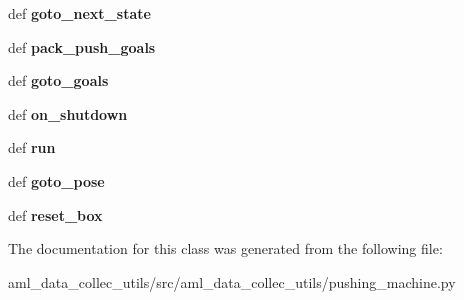 \begin{DoxyCompactItemize}
\item 
\hypertarget{classaml__data__collec__utils_1_1pushing__machine_1_1_push_machine_a55192fc3a9d96d893f7743472d51e7d8}{def {\bfseries goto\-\_\-next\-\_\-state}}\label{classaml__data__collec__utils_1_1pushing__machine_1_1_push_machine_a55192fc3a9d96d893f7743472d51e7d8}

\item 
\hypertarget{classaml__data__collec__utils_1_1pushing__machine_1_1_push_machine_af849340ad5c34bb485e6ced00504d757}{def {\bfseries pack\-\_\-push\-\_\-goals}}\label{classaml__data__collec__utils_1_1pushing__machine_1_1_push_machine_af849340ad5c34bb485e6ced00504d757}

\item 
\hypertarget{classaml__data__collec__utils_1_1pushing__machine_1_1_push_machine_aaebe1626a701247c98d0060411a5ba74}{def {\bfseries goto\-\_\-goals}}\label{classaml__data__collec__utils_1_1pushing__machine_1_1_push_machine_aaebe1626a701247c98d0060411a5ba74}

\item 
\hypertarget{classaml__data__collec__utils_1_1pushing__machine_1_1_push_machine_a2675cee65d54c4140d4f53ef069522b9}{def {\bfseries on\-\_\-shutdown}}\label{classaml__data__collec__utils_1_1pushing__machine_1_1_push_machine_a2675cee65d54c4140d4f53ef069522b9}

\item 
\hypertarget{classaml__data__collec__utils_1_1pushing__machine_1_1_push_machine_ad16c2e4ebe0b22dbeff541c06e0a2810}{def {\bfseries run}}\label{classaml__data__collec__utils_1_1pushing__machine_1_1_push_machine_ad16c2e4ebe0b22dbeff541c06e0a2810}

\item 
\hypertarget{classaml__data__collec__utils_1_1pushing__machine_1_1_push_machine_a981fb5c5d822c221966c92744a894d66}{def {\bfseries goto\-\_\-pose}}\label{classaml__data__collec__utils_1_1pushing__machine_1_1_push_machine_a981fb5c5d822c221966c92744a894d66}

\item 
\hypertarget{classaml__data__collec__utils_1_1pushing__machine_1_1_push_machine_a9b902846ac1712043d656ece79717edd}{def {\bfseries reset\-\_\-box}}\label{classaml__data__collec__utils_1_1pushing__machine_1_1_push_machine_a9b902846ac1712043d656ece79717edd}

\end{DoxyCompactItemize}


The documentation for this class was generated from the following file\-:\begin{DoxyCompactItemize}
\item 
aml\-\_\-data\-\_\-collec\-\_\-utils/src/aml\-\_\-data\-\_\-collec\-\_\-utils/pushing\-\_\-machine.\-py\end{DoxyCompactItemize}
